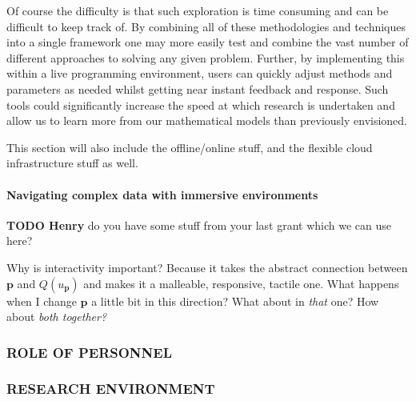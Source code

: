 \documentclass[a4paper,fontsize=12pt]{scrartcl}
\begin{document}
Of course the difficulty is that such exploration is time consuming
and can be difficult to keep track of. By combining all of these
methodologies and techniques into a single framework one may more
easily test and combine the vast number of different approaches to
solving any given problem. Further, by implementing this within a live
programming environment, users can quickly adjust methods and
parameters as needed whilst getting near instant feedback and
response. Such tools could significantly increase the speed at which
research is undertaken and allow us to learn more from our
mathematical models than previously envisioned.

This section will also include the offline/online stuff, and the
flexible cloud infrastructure stuff as well.

\paragraph{Navigating complex data with immersive environments}

\noindent
\textbf{TODO Henry} do you have some stuff from your last grant which
we can use here?

Why is interactivity important? Because it takes the abstract
connection between $\mathbf{p}$ and $Q(u_{\mathbf{p}})$ and makes it a malleable,
responsive, tactile one. What happens when I change $\mathbf{p}$ a little bit
in this direction? What about in \emph{that} one? How about \emph{both
  together?}


\subsubsection*{ROLE OF PERSONNEL}



\subsubsection*{RESEARCH ENVIRONMENT}
\end{document}
